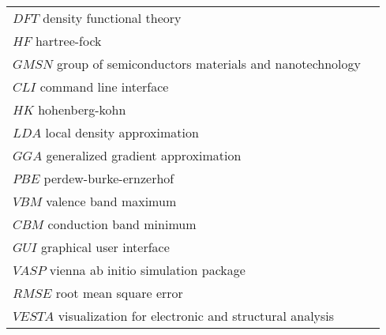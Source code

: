 \begin{longtable}{ll}
$DFT$ density functional theory \\
$HF$ hartree-fock \\
$GMSN$ group of semiconductors materials and nanotechnology\\
$CLI$ command line interface \\
$HK$ hohenberg-kohn \\
$LDA$ local density approximation \\
$GGA$ generalized gradient approximation \\
$PBE$ perdew-burke-ernzerhof \\
$VBM$ valence band maximum \\
$CBM$ conduction band minimum \\
$GUI$ graphical user interface \\
$VASP$ vienna ab initio simulation package \\
$RMSE$ root mean square error \\
$VESTA$ visualization for electronic and structural analysis \\
\end{longtable}